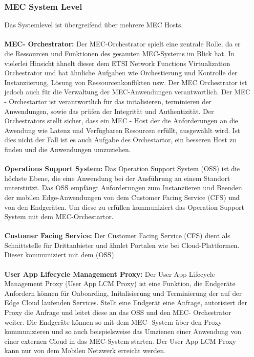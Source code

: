 \documentclass[runningheads]{llncs}
\numberwithin{figure}{section}
\begin{document}
\subsubsection{MEC System Level}
Das Systemlevel ist übergreifend über mehrere MEC Hosts. 
\\
\\
\textbf{MEC- Orchestrator:}
Der MEC-Orchestrator spielt eine zentrale Rolle, 
da er die Ressourcen und Funktionen des gesamten MEC-Systems im Blick hat. 
In vielerlei Hinsicht ähnelt dieser dem ETSI Network Functions Virtualization Orchestrator und hat ähnliche 
Aufgaben wie Orchestierung und Kontrolle der Instanziierung, Lösung von Ressourcenkonflikten usw. 
Der MEC Orchestrator ist jedoch auch für die Verwaltung der MEC-Anwendungen verantwortlich. 
Der MEC - Orchestartor ist verantwortlich für das initalisieren, terminieren der Anwendungen, sowie das prüfen
der Integrität und Authentizität. Der Orchestrators stellt sicher, 
dass ein MEC - Host der die Anforderungen an die Awendung wie Latenz und Verfügbaren Resourcen erfüllt, ausgewählt wird.
Ist dies nicht der Fall ist es auch Aufgabe des Orchestartor, ein besseren Host zu finden und die Anwendungen umzuziehen.
\\
\\
\textbf{Operations Support System:}
Das Operation Support System (OSS) ist die höchste Ebene, die eine Anwendung bei der Ausführung an einem Standort unterstützt. 
Das OSS empfängt Anforderungen zum Instanziieren und Beenden der mobilen Edge-Anwendungen von dem Customer Facing Service (CFS) und von den Endgeräten.
Um diese zu erfüllen kommuniziert das Operation Support System mit dem MEC-Orchestartor.
\\
\\
\textbf{Customer Facing Service:}
Der Customer Facing Service (CFS) dient als Schnittstelle für Drittanbieter und ähnlet Portalen wie bei Cloud-Plattformen. 
Dieser kommuniziert mit dem (OSS)
\\
\\
\textbf{User App Lifecycle Management Proxy:} 
Der User App Lifecycle Management Proxy (User App LCM Proxy) ist eine Funktion, die Endgeräte Anfordern können für Onboarding, Initalisierung und Terminierung der auf der
Edge Cloud laufenden Services. Stellt eine Endgerät eine Anfrage, autorisiert der Proxy die Anfrage und leitet diese an das OSS und den MEC- Orchestrator weiter. 
Die Endgeräte können so mit dem MEC- System über den Proxy kommunizieren und so auch beispielsweise das Umzienen einer Anwendung von 
einer externen Cloud in das MEC-System starten. Der User App LCM Proxy kann nur von dem Mobilen Netzwerk erreicht werden.
\end{document}
